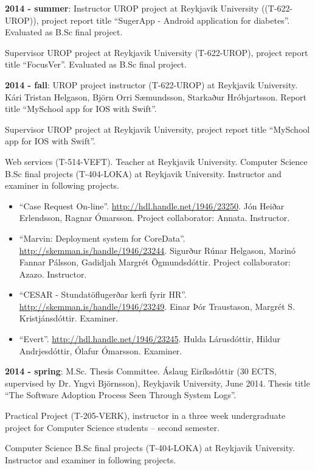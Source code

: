 \textbf{2014 - summer}:
Instructor UROP project at Reykjavik University ((T-622-UROP)), project report
title ``SugerApp - Android application for diabetes''. Evaluated as B.Sc final
project.

Supervisor UROP project at Reykjavik University (T-622-UROP), project report
title ``FocusVer''. Evaluated as B.Sc final project.

\textbf{2014 - fall}: UROP project instructor (T-622-UROP) at Reykjavik
University. Kári Tristan Helgason, Björn Orri Sæmundsson, Starkaður
Hróbjartsson. Report title ``MySchool app for IOS with Swift''.

Supervisor UROP project at Reykjavik University, project report title
``MySchool app for IOS with Swift''.

Web services (T-514-VEFT). Teacher at Reykjavik University. Computer Science
B.Sc final projects (T-404-LOKA) at Reykjavik University. Instructor and
examiner in following projects.

\begin{itemize}
\item ``Case Request On-line''. \url{http://hdl.handle.net/1946/23250}. Jón
    Heiðar Erlendsson, Ragnar Ómarsson. Project collaborator: Annata.
        Instructor.

\item ``Marvin: Deployment system for CoreData''.
    \url{http://skemman.is/handle/1946/23244}. Sigurður Rúnar Helgason, Marinó
        Fannar Pálsson, Gadidjah Margrét Ögmundsdóttir. Project collaborator:
        Azazo. Instructor.

\item ``CESAR - Stundatöflugerðar kerfi fyrir HR''.
    \url{http://skemman.is/handle/1946/23249}. Einar Þór Traustason, Margrét S.
        Kristjánsdóttir. Examiner. 

\item ``Evert''. \url{http://hdl.handle.net/1946/23245}. Hulda Lárusdóttir,
    Hildur Andrjesdóttir, Ólafur Ómarsson. Examiner.
\end{itemize}

\textbf{2014 - spring}:
M.Sc. Thesis Committee. Áslaug Eiríksdóttir (30 ECTS, supervised by Dr. Yngvi
Björnsson), Reykjavik University, June 2014. Thesis title ``The Software
Adoption Process Seen Through System Logs''.

Practical Project (T-205-VERK), instructor in a three week undergraduate
project for Computer Science students -- second semester.

Computer Science B.Sc final projects (T-404-LOKA) at Reykjavik University.
Instructor and examiner in following projects.

